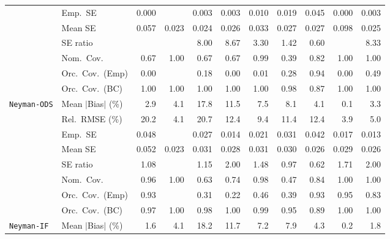 \begin{landscape}
\begin{longtable}{llrrrrrrrrr}
 & Emp.\ SE & 0.000 &  & 0.003 & 0.003 & 0.010 & 0.019 & 0.045 & 0.000 & 0.003 \\
 & Mean SE & 0.057 & 0.023 & 0.024 & 0.026 & 0.033 & 0.027 & 0.027 & 0.098 & 0.025 \\
 & SE ratio &  &  & 8.00 & 8.67 & \cellcolor{rankthree}3.30 & \cellcolor{ranktwo}1.42 & \cellcolor{rankone}0.60 &  & 8.33 \\
 & Nom.\ Cov. & 0.67 & \cellcolor{ranktwo}1.00 & 0.67 & 0.67 & \cellcolor{rankone}0.99 & 0.39 & \cellcolor{rankthree}0.82 & \cellcolor{ranktwo}1.00 & \cellcolor{ranktwo}1.00 \\
 & Orc.\ Cov.\ (Emp) & 0.00 &  & 0.18 & 0.00 & 0.01 & \cellcolor{rankthree}0.28 & \cellcolor{rankone}0.94 & 0.00 & \cellcolor{ranktwo}0.49 \\
 & Orc.\ Cov.\ (BC) & \cellcolor{ranktwo}1.00 & \cellcolor{ranktwo}1.00 & \cellcolor{ranktwo}1.00 & \cellcolor{ranktwo}1.00 & \cellcolor{ranktwo}1.00 & \cellcolor{rankone}0.98 & \cellcolor{rankthree}0.87 & \cellcolor{ranktwo}1.00 & \cellcolor{ranktwo}1.00 \\
\addlinespace[2pt]
\quad \texttt{Neyman-ODS} & Mean $|$Bias$|$ (\%) & \cellcolor{ranktwo}2.9 & 4.1 & 17.8 & 11.5 & 7.5 & 8.1 & 4.1 & \cellcolor{rankone}0.1 & \cellcolor{rankthree}3.3 \\
 & Rel.\ RMSE (\%) & 20.2 & \cellcolor{ranktwo}4.1 & 20.7 & 12.4 & 9.4 & 11.4 & 12.4 & \cellcolor{rankone}3.9 & \cellcolor{rankthree}5.0 \\
 & Emp.\ SE & 0.048 &  & 0.027 & 0.014 & 0.021 & 0.031 & 0.042 & 0.017 & 0.013 \\
 & Mean SE & 0.052 & 0.023 & 0.031 & 0.028 & 0.031 & 0.030 & 0.026 & 0.029 & 0.026 \\
 & SE ratio & \cellcolor{ranktwo}1.08 &  & \cellcolor{rankthree}1.15 & 2.00 & 1.48 & \cellcolor{rankone}0.97 & 0.62 & 1.71 & 2.00 \\
 & Nom.\ Cov. & \cellcolor{rankone}0.96 & \cellcolor{rankthree}1.00 & 0.63 & 0.74 & \cellcolor{ranktwo}0.98 & 0.47 & 0.84 & \cellcolor{rankthree}1.00 & \cellcolor{rankthree}1.00 \\
 & Orc.\ Cov.\ (Emp) & \cellcolor{ranktwo}0.93 &  & 0.31 & 0.22 & 0.46 & 0.39 & \cellcolor{ranktwo}0.93 & \cellcolor{rankone}0.95 & \cellcolor{rankthree}0.83 \\
 & Orc.\ Cov.\ (BC) & \cellcolor{ranktwo}0.97 & 1.00 & \cellcolor{rankthree}0.98 & 1.00 & 0.99 & \cellcolor{rankone}0.95 & 0.89 & 1.00 & 1.00 \\
\addlinespace[2pt]
\quad \texttt{Neyman-IF} & Mean $|$Bias$|$ (\%) & \cellcolor{ranktwo}1.6 & 4.1 & 18.2 & 11.7 & 7.2 & 7.9 & 4.3 & \cellcolor{rankone}0.2 & \cellcolor{rankthree}1.8 \\

\end{longtable}
\end{landscape}
